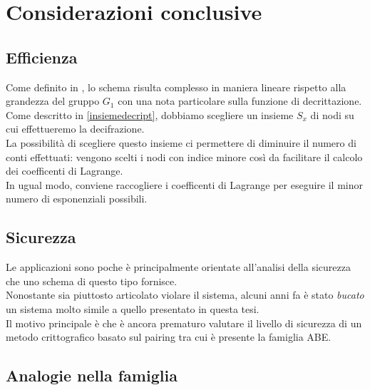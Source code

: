 \chapter{Considerazioni conclusive}



\section{Efficienza}
Come definito in \cite[4.3]{kpabe}, lo schema risulta complesso in maniera lineare rispetto alla grandezza del gruppo $G_1$ con una nota particolare sulla funzione di decrittazione.\\
Come descritto in \ref{insiemedecript}, dobbiamo scegliere un insieme $S_x$ di nodi su cui effettueremo la decifrazione.\\
La possibilità di scegliere questo insieme ci permettere di diminuire il numero di conti effettuati: vengono scelti i nodi con indice minore così da facilitare il calcolo dei coefficenti di Lagrange.\\
In ugual modo, conviene raccogliere i coefficenti di Lagrange per eseguire il minor numero di esponenziali possibili.


\section{Sicurezza}\label{secur}

Le applicazioni sono poche è principalmente orientate all'analisi della sicurezza che uno schema di questo tipo fornisce.\\
Nonostante sia piuttosto articolato violare il sistema, alcuni anni fa \cite{nict} è stato \emph{bucato} un sistema molto simile a quello presentato in questa tesi.\\
Il motivo principale è che è ancora prematuro valutare il livello di sicurezza di un metodo crittografico basato sul pairing tra cui è presente la famiglia ABE.

\section{Analogie nella famiglia}\label{ibeabe}

